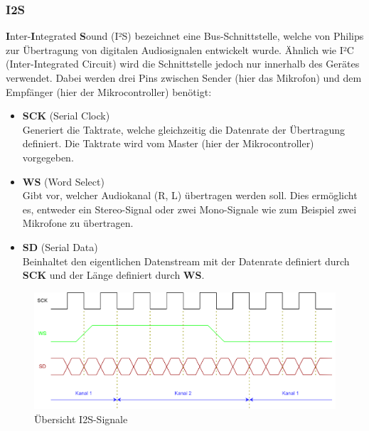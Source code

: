 \documentclass[12pt]{article}
\begin{document}
	
	\subsubsection*{I2S} \label{I2S}
	\textbf{I}nter-\textbf{I}ntegrated \textbf{S}ound (I²S) bezeichnet eine Bus-Schnittstelle, welche von Philips zur Übertragung von digitalen Audiosignalen entwickelt wurde. Ähnlich wie I²C (Inter-Integrated Circuit) wird die Schnittstelle jedoch nur innerhalb des Gerätes verwendet. Dabei werden drei Pins zwischen Sender (hier das Mikrofon) und dem Empfänger (hier der Mikrocontroller) benötigt:
	\begin{itemize}
		\item \textbf{SCK} \quad (Serial Clock) \\
		Generiert die Taktrate, welche gleichzeitig die Datenrate der Übertragung definiert. Die Taktrate wird vom Master (hier der Mikrocontroller) vorgegeben.
		\item \color{green}\textbf{WS}\color{black} \quad (Word Select) \\
		Gibt vor, welcher Audiokanal (R, L) übertragen werden soll. Dies ermöglicht es, entweder ein Stereo-Signal oder zwei Mono-Signale wie zum Beispiel zwei Mikrofone zu übertragen.
		\item \color{red}\textbf{SD}\color{black} \quad (Serial Data) \\
		Beinhaltet den eigentlichen Datenstream mit der Datenrate definiert durch \textbf{SCK} und der Länge definiert durch \color{green}\textbf{WS}\color{black}.
	\end{itemize}
	\begin{figure}[H]
		\centering
		\includegraphics[width=1\linewidth]{images/BAT_I2S}
		\caption[]{Übersicht I2S-Signale}
		\label{fig:bati2s}
	\end{figure}
	\newpage
\end{document}
